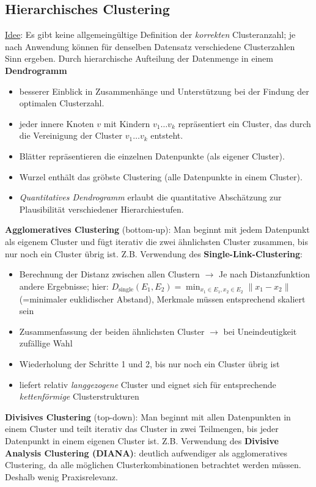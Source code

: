 \subsection{Hierarchisches Clustering}
\label{hierarchischesClustering}

\underline{Idee}: Es gibt keine allgemeingültige Definition der \emph{korrekten} Clusteranzahl; je nach Anwendung können für denselben Datensatz verschiedene Clusterzahlen Sinn ergeben. Durch hierarchische Aufteilung der Datenmenge in einem \textbf{Dendrogramm}
\begin{itemize}
    \item besserer Einblick in Zusammenhänge und Unterstützung bei der Findung der optimalen Clusterzahl.
    \item jeder innere Knoten $v$ mit Kindern $v_1 \dots v_k$ repräsentiert ein Cluster, das durch die Vereinigung der Cluster $v_1 \dots v_k$ entsteht.
    \item Blätter repräsentieren die einzelnen Datenpunkte (als eigener Cluster).
    \item Wurzel enthält das gröbste Clustering (alle Datenpunkte in einem Cluster).
    \item \emph{Quantitatives Dendrogramm} erlaubt die quantitative Abschätzung zur Plausibilität verschiedener Hierarchiestufen.
\end{itemize}

\textbf{Agglomeratives Clustering} (bottom-up): Man beginnt mit jedem Datenpunkt als eigenem Cluster und fügt iterativ die zwei ähnlichsten Cluster zusammen, bis nur noch ein Cluster übrig ist. Z.B. Verwendung des \textbf{Single-Link-Clustering}:
\begin{itemize}
    \item Berechnung der Distanz zwischen allen Clustern $\rightarrow$ Je nach Distanzfunktion andere Ergebnisse; hier: $D_\text{single}(E_1, E_2)=\min_{x_1\in E_1, x_2\in E_2}\|x_1-x_2\|$ (=minimaler euklidischer Abstand), Merkmale müssen entsprechend skaliert sein
    \item Zusammenfassung der beiden ähnlichsten Cluster $\rightarrow$ bei Uneindeutigkeit zufällige Wahl
    \item Wiederholung der Schritte 1 und 2, bis nur noch ein Cluster übrig ist
    \item liefert relativ \emph{langgezogene} Cluster und eignet sich für entsprechende \emph{kettenförmige} Clusterstrukturen
\end{itemize}

\textbf{Divisives Clustering} (top-down): Man beginnt mit allen Datenpunkten in einem Cluster und teilt iterativ das Cluster in zwei Teilmengen, bis jeder Datenpunkt in einem eigenen Cluster ist. Z.B. Verwendung des \textbf{Divisive Analysis Clustering (DIANA)}: deutlich aufwendiger als agglomeratives Clustering, da alle möglichen Clusterkombinationen betrachtet werden müssen. Deshalb wenig Praxisrelevanz.